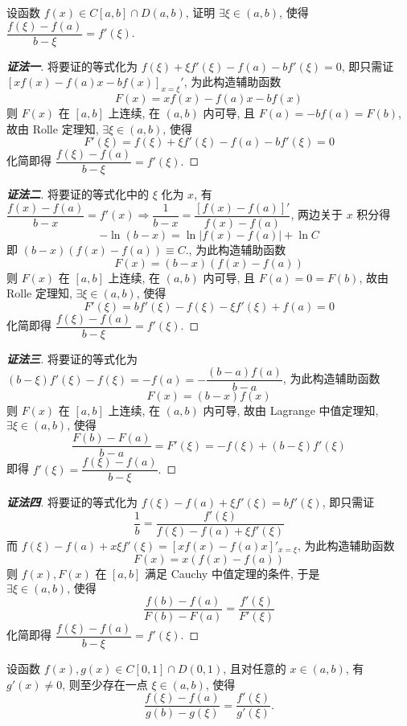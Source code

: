 \begin{example}
    设函数 $f(x)\in C[a,b]\cap D(a,b)$, 证明 $\exists\xi\in(a,b)$, 
    使得 $\dfrac{f(\xi)-f(a)}{b-\xi}=f'(\xi).$
\end{example}
\begin{proof}[{\songti \textbf{证法一}}]
    将要证的等式化为 $f(\xi)  +\xi f'(\xi)  -f(a)  -bf'(\xi)  =0$, 即只需证
    $\left[ xf(x)  -f(a)  x-bf(x)  \right] _{x=\xi }'$, 为此构造辅助函数
    $$F(x)  =xf(x)  -f(a)  x-bf(x)  $$
    则 $F(x)$ 在 $[a,b]$ 上连续, 在 $(a,b)$ 内可导, 且 $F(a)=-bf(a)=F(b)$, 故由 Rolle 定理知, $\exists\xi\in(a,b)\text{, 使得 }$
    $$F'(\xi)=f(\xi)+\xi f'(\xi)-f(a)-bf'(\xi)=0$$
    化简即得 $\dfrac{f(\xi)-f(a)}{b-\xi}=f'(\xi).$
\end{proof}
\begin{proof}[{\songti \textbf{证法二}}]
    将要证的等式化中的 $\xi$ 化为 $x$, 有 $\dfrac{f(x)-f(a)}{b-x}=f'(x)  \Rightarrow\dfrac{1}{b-x}=\dfrac{[f(x)-f(a)]'}{f(x)-f(a)}$, 两边关于 $x$ 积分得 $$-\ln(b-x)=\ln|f(x)-f(a)|+\ln C$$
    即 $(b-x)(f(x)-f(a))\equiv C.$, 为此构造辅助函数
    $$F(x)=(b-x)(f(x)-f(a))$$
    则 $F(x)$ 在 $[a,b]$ 上连续, 在 $(a,b)$ 内可导, 且 $F(a)=0=F(b)$, 故由 Rolle 定理知, $\exists\xi\in(a,b)\text{, 使得 }$
    $$F'(\xi)=bf'(\xi)-f(\xi)-\xi f'(\xi)+f(a)=0$$
    化简即得 $\dfrac{f(\xi)-f(a)}{b-\xi}=f'(\xi).$
\end{proof}
\begin{proof}[{\songti \textbf{证法三}}]
    将要证的等式化为 $(b-\xi)f'(\xi)-f(\xi)=-f(a)=-\dfrac{(b-a)f(a)}{b-a}$, 为此构造辅助函数
    $$F(x)=(b-x)f(x)$$ 则 $F(x)$ 在 $[a,b]$ 上连续, 在 $(a,b)$ 内可导, 
    故由 Lagrange 中值定理知, $\exists\xi\in(a,b)\text{, 使得 }$
    $$\dfrac{F(b)-F(a)}{b-a}=F'(\xi)=-f(\xi)+(b-\xi)f'(\xi)$$
    即得 $f'(\xi)=\dfrac{f(\xi)-f(a)}{b-\xi}.$
\end{proof}
\begin{proof}[{\songti \textbf{证法四}}]
    将要证的等式化为 $f(\xi)-f(a)+\xi f'(\xi)=bf'(\xi)$, 即只需证 $$\dfrac{1}{b}=\dfrac{f'(\xi)}{f(\xi)-f(a)+\xi f'(\xi)}$$
    而 $f(\xi)-f(a)+x\xi f'(\xi)=\left[xf(x)-f(a)x\right]'_{x=\xi}$, 为此构造辅助函数
    $$F(x)=x(f(x)-f(a))$$
    则 $f(x),F(x)$ 在 $[a,b]$ 满足 Cauchy 中值定理的条件, 于是 $\exists\xi\in(a,b)\text{, 使得 }$
    $$\dfrac{f(b)-f(a)}{F(b)-F(a)}=\dfrac{f'(\xi)}{F'(\xi)}$$
    化简即得 $\dfrac{f(\xi)-f(a)}{b-\xi}=f'(\xi).$
\end{proof}
\begin{inference}
    设函数 $f(x),g(x)\in C[0,1]\cap D(0,1)$, 且对任意的 $x\in(a,b)$, 有 $g'(x)\neq0$, 
    则至少存在一点 $\xi\in(a,b)$, 使得 $$\dfrac{f(\xi)-f(a)}{g(b)-g(\xi)}=\dfrac{f'(\xi)}{g'(\xi)}.$$
\end{inference}
